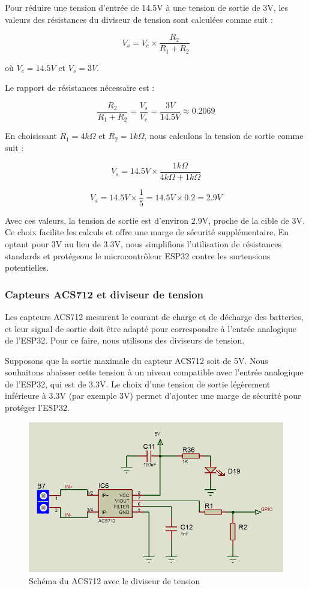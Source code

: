 Pour réduire une tension d'entrée de 14.5V à une tension de sortie de 3V, les valeurs des résistances du diviseur de tension sont calculées comme suit :

\[
V_{s} = V_{e} \times \frac{R_2}{R_1 + R_2}
\]

où \( V_{e} = 14.5V \) et \( V_{s} = 3V \). 

Le rapport de résistances nécessaire est :

\[
\frac{R_2}{R_1 + R_2} = \frac{V_{s}}{V_{e}} = \frac{3V}{14.5V} \approx 0.2069
\]

En choisissant \( R_1 = 4 k\Omega \) et \( R_2 = 1 k\Omega \), nous calculons la tension de sortie comme suit :

\[
V_{s} = 14.5V \times \frac{1 k\Omega}{4 k\Omega + 1 k\Omega}
\]

\[
V_{s} = 14.5V \times \frac{1}{5} = 14.5V \times 0.2 = 2.9V
\]

Avec ces valeurs, la tension de sortie est d'environ 2.9V, proche de la cible de 3V. Ce choix facilite les calculs et offre une marge de sécurité supplémentaire. En optant pour 3V au lieu de 3.3V, nous simplifions l'utilisation de résistances standards et protégeons le microcontrôleur ESP32 contre les surtensions potentielles.

\subsubsection*{Capteurs ACS712 et diviseur de tension}

Les capteurs ACS712 mesurent le courant de charge et de décharge des batteries, et leur signal de sortie doit être adapté pour correspondre à l'entrée analogique de l'ESP32. Pour ce faire, nous utilisons des diviseurs de tension.

Supposons que la sortie maximale du capteur ACS712 soit de 5V. Nous souhaitons abaisser cette tension à un niveau compatible avec l'entrée analogique de l'ESP32, qui est de 3.3V. Le choix d'une tension de sortie légèrement inférieure à 3.3V (par exemple 3V) permet d'ajouter une marge de sécurité pour protéger l'ESP32.
\begin{figure}[H]
	\centering
	\includegraphics[width=13cm]{./img/composants/ACSAVECRESISTANCE.PNG}
	\caption{Schéma du ACS712 avec le diviseur de tension}
	\label{fig:relais_5vdc}
\end{figure}

